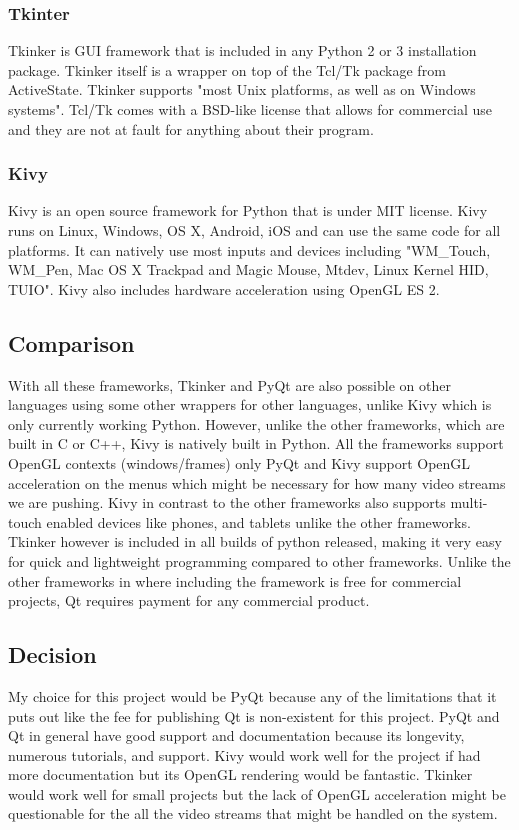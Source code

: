 \documentclass[onecolumn, draftclsnofoot, 10pt, compsoc]{IEEEtran}
\begin{document}
\subsubsection{Tkinter}
Tkinker is GUI framework that is included in any Python 2 or 3 installation package.
Tkinker itself is a wrapper on top of the Tcl/Tk package from ActiveState. \cite{Tkinker}
Tkinker supports "most Unix platforms, as well as on Windows systems". \cite{Tkinker}
Tcl/Tk comes with a BSD-like license that allows for commercial use and they are not at fault for anything about their program.
\subsubsection{Kivy}
Kivy is an open source framework for Python that is under MIT license. \cite{Kivy}
Kivy runs on Linux, Windows, OS X, Android, iOS and can use the same code for all platforms.
It can natively use most inputs and devices including "WM\_Touch, WM\_Pen, Mac OS X Trackpad and Magic Mouse, Mtdev, Linux Kernel HID, TUIO". \cite{Kivy}
Kivy also includes hardware acceleration using OpenGL ES 2.
\subsection{Comparison}
With all these frameworks, Tkinker and PyQt are also possible on other languages using some other wrappers for other languages, unlike Kivy which is only currently working Python.
However, unlike the other frameworks, which are built in C or C++, Kivy is natively built in Python.
All the frameworks support OpenGL contexts (windows/frames) only PyQt and Kivy support OpenGL acceleration on the menus which might be necessary for how many video streams we are pushing.
Kivy in contrast to the other frameworks also supports multi-touch enabled devices like phones, and tablets unlike the other frameworks.
Tkinker however is included in all builds of python released, making it very easy for quick and lightweight programming compared to other frameworks.
Unlike the other frameworks in where including the framework is free for commercial projects, Qt requires payment for any commercial product.
\subsection{Decision}
My choice for this project would be PyQt because any of the limitations that it puts out like the fee for publishing Qt is non-existent for this project.
PyQt and Qt in general have good support and documentation because its longevity, numerous tutorials, and support.
Kivy would work well for the project if had more documentation but its OpenGL rendering would be fantastic.
Tkinker would work well for small projects but the lack of OpenGL acceleration might be questionable for the all the video streams that might be handled on the system.
\end{document}
